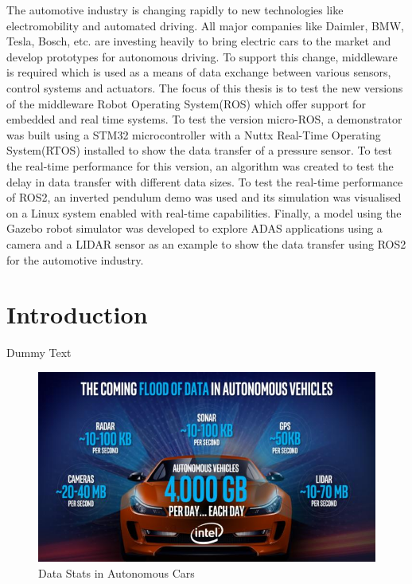\documentclass[%
xelatex,
	oneside,		%
	12pt,			%
	parskip=half,	%
	abstracton,
	chapterprefix=true%
    appendixprefix=true]
{scrbook}
\begin{document}
The automotive industry is changing rapidly to new technologies like electromobility and automated driving. All major companies like Daimler, BMW, Tesla, Bosch, etc. are investing heavily to bring electric cars to the market and develop prototypes for autonomous driving. To support this change, middleware is required which is used as a means of data exchange between various sensors, control systems and actuators. The focus of this thesis is to test the new versions of the middleware Robot Operating System(ROS) which offer support for embedded and real time systems. To test the version micro-ROS, a demonstrator was built using a STM32 microcontroller with a Nuttx Real-Time Operating System(RTOS) installed to show the data transfer of a pressure sensor. To test the real-time performance for this version, an algorithm was created to test the delay in data transfer with different data sizes. To test the real-time performance of ROS2, an inverted pendulum demo was used and its simulation was visualised on a Linux system enabled with real-time capabilities. Finally, a model using the Gazebo robot simulator was developed to explore ADAS applications using a camera and a LIDAR sensor as an example to show the data transfer using ROS2 for the automotive industry.
\clearpage

	
\rofoot[\pagemark]{\pagemark}
\printnomenclature
	

	\tableofcontents
	
	


	\chapter{Introduction}

\rofoot[\pagemark]{\pagemark}

  Dummy Text 
\begin{figure}[ht]
\begin{center}
\includegraphics[scale=.5]{fig/autonomous-vehicle-data-intel-100697604-large.jpg}
\caption[Data Stats in Autonomous Cars]{Data Stats in Autonomous Cars\cite{dumm}}
\label{fig:dumm}
\end{center}
\end{figure}  
  
\end{document}
